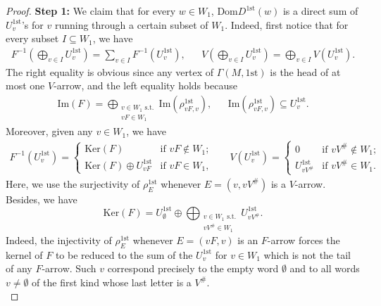 \documentclass[12pt]{amsart}
\theoremstyle{definition}
\newcommand{\<}{\langle}   %
\renewcommand{\>}{\rangle} %
\begin{document}
\begin{proof}
    \textbf{Step 1:} We claim that for every $w\in W_1$, $\mathrm{Dom}D^{1\mathrm{st}}(w)$ is a direct sum of $U^{1\mathrm{st}}_v$'s for $v$ running through a certain subset of $W_1$. Indeed, first notice that for every subset $I \subseteq  W_1$, we have 
    \begin{align*}
        F^{-1}\left(\bigoplus_{v \in I} U^{1\mathrm{st}}_v\right) = \sum_{v \in I} F^{-1}(U^{1\mathrm{st}}_v), & & V\left(\bigoplus_{v \in I} U^{1\mathrm{st}}_v\right) = \bigoplus_{v \in I} V(U^{1\mathrm{st}}_v).
    \end{align*}
    The right equality is obvious since any vertex of $\Gamma(M,1\mathrm{st})$ is the head of at most one $V$-arrow, and the left equality holds because 
    \begin{align*}
    \mathrm{Im}(F) = \bigoplus_{\substack{v \in W_1 \text{ s.t.}\\ vF \in W_1}} \mathrm{Im}(\rho_{vF,v}^{1\mathrm{st}}), & & \mathrm{Im}(\rho_{vF,v}^{1\mathrm{st}}) \subseteq  U^{1\mathrm{st}}_v.
    \end{align*}
    Moreover, given any $v \in W_1$, we have 
    \begin{align*}
        F^{-1}(U^{1\mathrm{st}}_v) = \begin{cases}
            \mathrm{Ker}(F) & \text{if } vF \not \in W_1;\\
            \mathrm{Ker}(F) \oplus U^{1\mathrm{st}}_{vF} & \text{if } vF \in W_1,
        \end{cases}
        & &
        V(U^{1\mathrm{st}}_v) = \begin{cases}
            0 & \text{if } vV^{\#} \not \in W_1;\\
            U^{1\mathrm{st}}_{vV^{\#}} & \text{if } vV^{\#} \in W_1.
        \end{cases}
    \end{align*}
    Here, we use the surjectivity of $\rho^{1\mathrm{st}}_E$ whenever $E = (v,vV^{\#})$ is a $V$-arrow. Besides, we have 
    \begin{equation*}
        \mathrm{Ker}(F) = U^{1\mathrm{st}}_{\emptyset} \oplus \bigoplus_{\substack{v \in W_1 \text{ s.t.} \\ vV^{\#} \in W_1}} U^{1\mathrm{st}}_{vV^{\#}}.
    \end{equation*}
    Indeed, the injectivity of $\rho^{1\mathrm{st}}_E$ whenever $E = (vF,v)$ is an $F$-arrow forces the kernel of $F$ to be reduced to the sum of the $U^{1\mathrm{st}}_v$ for $v \in W_1$ which is not the tail of any $F$-arrow. Such $v$ correspond precisely to the empty word $\emptyset$ and to all words $v \not = \emptyset$ of the first kind whose last letter is a $V^{\#}$.\\

\end{proof}
\end{document}
